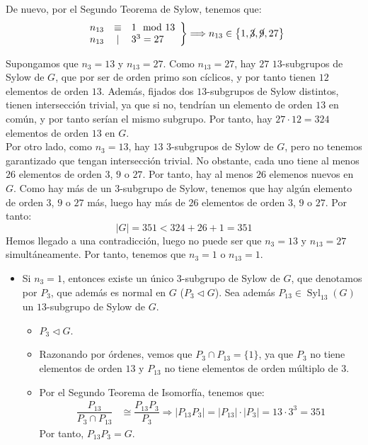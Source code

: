 \documentclass[12pt]{article}
\DeclareMathOperator{\Syl}{Syl}
\begin{document}
\begin{ejercicio}
\begin{enumerate}
            De nuevo, por el Segundo Teorema de Sylow, tenemos que:
            \begin{equation*}
                \left.\begin{array}{rcl}
                    n_{13} & \equiv & 1 \mod 13 \\
                    n_{13} & \mid & 3^3=27
                \end{array}\right\}
                \Longrightarrow n_{13} \in \left\{1,\cancel{3},\cancel{9},27\right\}
            \end{equation*}

            Supongamos que $n_3=13$ y $n_{13}=27$. Como $n_{13}=27$, hay $27$ $13$-subgrupos de Sylow de $G$, que por ser de orden primo son cíclicos, y por tanto tienen $12$ elementos de orden $13$. Además, fijados dos $13$-subgrupos de Sylow distintos, tienen intersección trivial, ya que si no, tendrían un elemento de orden $13$ en común, y por tanto serían el mismo subgrupo. Por tanto, hay $27\cdot 12=324$ elementos de orden $13$ en $G$.\\


            Por otro lado, como $n_3=13$, hay $13$ $3$-subgrupos de Sylow de $G$, pero no tenemos garantizado que tengan intersección trivial. No obstante, cada uno tiene al menos $26$ elementos de orden $3$, $9$ o $27$. Por tanto, hay al menos $26$ elemenos nuevos en $G$. Como hay más de un $3$-subgrupo de Sylow, tenemos que hay algún elemento de orden $3$, $9$ o $27$ más, luego hay más de $26$ elementos de orden $3$, $9$ o $27$. Por tanto:
            \begin{equation*}
                |G| = 351 < 324 + 26 + 1 = 351
            \end{equation*}
            Hemos llegado a una contradicción, luego no puede ser que $n_3=13$ y $n_{13}=27$ simultáneamente. Por tanto, tenemos que $n_3=1$ o $n_{13}=1$.
            \begin{itemize}
                \item Si $n_3=1$, entonces existe un único $3$-subgrupo de Sylow de $G$, que denotamos por $P_3$, que además es normal en $G$ ($P_3 \lhd G$). Sea además $P_13\in \Syl_{13}(G)$ un $13$-subgrupo de Sylow de $G$.
                \begin{itemize}
                    \item $P_{3}\lhd G$.
                    \item Razonando por órdenes, vemos que $P_3\cap P_{13}=\{1\}$, ya que $P_3$ no tiene elementos de orden $13$ y $P_{13}$ no tiene elementos de orden múltiplo de $3$.
                    \item Por el Segundo Teorema de Isomorfía, tenemos que:
                    \begin{align*}
                        \dfrac{P_{13}}{P_{3}\cap P_{13}} & \cong \dfrac{P_{13}P_3}{P_3} \Longrightarrow |P_{13}P_3| = |P_{13}|\cdot |P_3| = 13\cdot 3^3 = 351
                    \end{align*}
                    Por tanto, $P_{13}P_3=G$.
                \end{itemize}


\end{itemize}
\end{enumerate}
\end{ejercicio}
\end{document}
